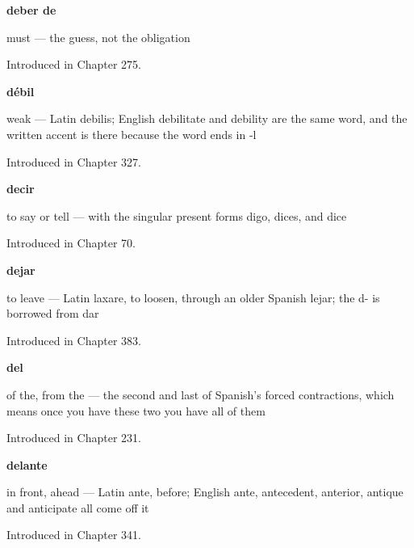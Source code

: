 \noindent\begin{minipage}[t]{\linewidth}
\raggedright
\textbf{deber de}\par
\small must — the guess, not the obligation\par
\footnotesize Introduced in Chapter 275.
\end{minipage}\par\medskip

\noindent\begin{minipage}[t]{\linewidth}
\raggedright
\textbf{débil}\par
\small weak — Latin debilis; English debilitate and debility are the same word, and the written accent is there because the word ends in -l\par
\footnotesize Introduced in Chapter 327.
\end{minipage}\par\medskip

\noindent\begin{minipage}[t]{\linewidth}
\raggedright
\textbf{decir}\par
\small to say or tell — with the singular present forms digo, dices, and dice\par
\footnotesize Introduced in Chapter 70.
\end{minipage}\par\medskip

\noindent\begin{minipage}[t]{\linewidth}
\raggedright
\textbf{dejar}\par
\small to leave — Latin laxare, to loosen, through an older Spanish lejar; the d- is borrowed from dar\par
\footnotesize Introduced in Chapter 383.
\end{minipage}\par\medskip

\noindent\begin{minipage}[t]{\linewidth}
\raggedright
\textbf{del}\par
\small of the, from the — the second and last of Spanish's forced contractions, which means once you have these two you have all of them\par
\footnotesize Introduced in Chapter 231.
\end{minipage}\par\medskip

\noindent\begin{minipage}[t]{\linewidth}
\raggedright
\textbf{delante}\par
\small in front, ahead — Latin ante, before; English ante, antecedent, anterior, antique and anticipate all come off it\par
\footnotesize Introduced in Chapter 341.
\end{minipage}\par\medskip

